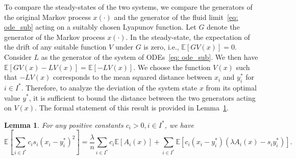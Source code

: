 \documentclass[a4paper]{article}
\theoremstyle{plain}
\newtheorem{lem}{Lemma}
\theoremstyle{definition}
\theoremstyle{case}
\theoremstyle{remark}
\newcommand{\brac}[1]{\left(#1\right)}
\newcommand{\sbrac}[1]{\left[#1\right]}
\newcommand{\expect}[1]{\mathbb{E}\sbrac{#1}}
\begin{document}
To compare the steady-states of the two systems, we compare the generators of the original Markov process $x(\cdot)$ and the generator of the fluid limit~\eqref{eq: ode_sub} acting on a suitably chosen Lyapunov function. 
Let $G$ denote the generator of the Markov process $x(\cdot)$. In the steady-state, the expectation of the drift of any suitable function $V$ under $G$ is zero, i.e., $\expect{GV(x)} =0$.
%
Consider $L$ as the generator of the system of ODEs~\eqref{eq: ode_sub}. We then have $\expect{GV(x) - LV(x)} = \expect{-LV(x)}$. We choose the function $V(x)$ such that $-LV(x)$ corresponds to the mean squared distance between $x_i$ and $y^*_i$ for $i \in I^*$. Therefore, to analyze the deviation of the system state $x$ from its optimal value $y^*$, it is sufficient to bound the distance between the two generators acting on $V(x)$. The formal statement of this result is provided in Lemma~\ref{lemma: generator coupling_sub}.
%
\begin{lem} \label{lemma: generator coupling_sub}
For any positive constants $c_i>0, i \in I^*$, we have
\begin{equation}
\label{eq: first bound for general policy_sub}
\expect{\sum_{i \in I^*} c_i s_i \brac{x_i - y_i^*}^2} =  \frac{\lambda}{n} \sum_ {i\in I^*} c_i \expect{A_i(x)}
+
\sum_{i \in I^*} \expect{c_i \brac{x_i - y_i^*}\brac{\lambda A_i(x) - s_i y_i^*}}.
\end{equation}
%
\end{lem}
%
\end{document}
